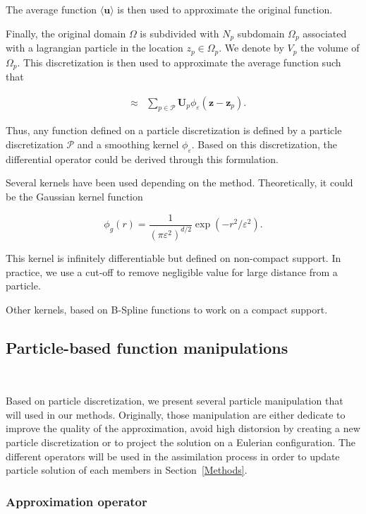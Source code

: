 The average function $\langle \bm u \rangle$ is then used to approximate the original function.

Finally, the original domain $\Omega$ is subdivided with $N_p$ subdomain $\Omega_p$ associated with a lagrangian particle in the location $z_p \in \Omega_p$. We denote by $V_p$ the volume of $\Omega_p$. This discretization is then used to approximate the average function such that

\begin{eqnarray}~\label{part_approx}
	&\approx& \sum_{p \in \mathcal P} \bm U_p \phi_\varepsilon (\bm z-\bm z_p).
\end{eqnarray}

Thus, any function defined on a particle discretization is defined by a particle discretization $\mathcal{P}$ and a smoothing kernel $\phi_\varepsilon$.
Based on this discretization, the differential operator could be derived through this formulation.

Several kernels have been used depending on the method. Theoretically, it could be the Gaussian kernel function

\begin{equation*}
	\phi_g(r) = \frac{1}{{(\pi \varepsilon^2)}^{d/2}} \exp(-r^2/\varepsilon^2).
\end{equation*}

This kernel is infinitely differentiable but defined on non-compact support. In practice, we use a cut-off to remove negligible value for large distance from a particle.

Other kernels, based on B-Spline functions to work on a compact support.

\subsection{Particle-based function manipulations}~\label{operators}

Based on particle discretization, we present several particle manipulation that will used in our methods. Originally, those manipulation are either dedicate to improve the quality of the approximation, avoid high distorsion by creating a new particle discretization or to project the solution on a Eulerian configuration. The different operators will be used in the assimilation process in
order to update particle solution of each members in Section~\ref{Methods}.

\subsubsection{Approximation operator}~\label{interpOp}

